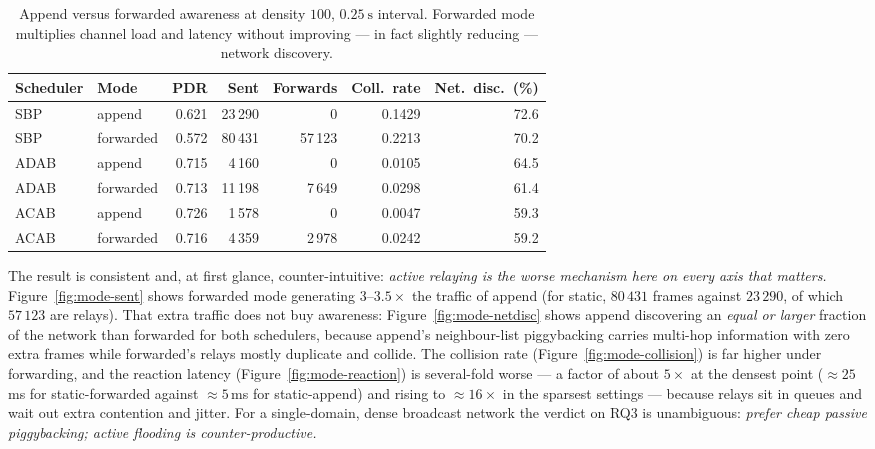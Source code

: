 \documentclass[12pt,a4paper,oneside]{report}
\begin{document}
\begin{table}[t]
\centering
\caption{Append versus forwarded awareness at density $100$,
$\SI{0.25}{\second}$ interval. Forwarded mode multiplies channel load and
latency without improving --- in fact slightly reducing --- network discovery.}
\label{tab:modes}
\begin{tabular}{llrrrrr}
\toprule
Scheduler & Mode & PDR & Sent & Forwards & Coll.\ rate & Net.\ disc.\ (\%) \\
\midrule
SBP  & append    & 0.621 & 23\,290 & 0      & 0.1429 & 72.6 \\
SBP  & forwarded & 0.572 & 80\,431 & 57\,123 & 0.2213 & 70.2 \\
ADAB & append    & 0.715 & 4\,160  & 0      & 0.0105 & 64.5 \\
ADAB & forwarded & 0.713 & 11\,198 & 7\,649  & 0.0298 & 61.4 \\
ACAB & append    & 0.726 & 1\,578  & 0      & 0.0047 & 59.3 \\
ACAB & forwarded & 0.716 & 4\,359  & 2\,978  & 0.0242 & 59.2 \\
\bottomrule
\end{tabular}
\end{table}

The result is consistent and, at first glance, counter-intuitive: \emph{active
relaying is the worse mechanism here on every axis that matters.}
Figure~\ref{fig:mode-sent} shows forwarded mode generating $3$--$3.5\times$ the
traffic of append (for static, $80\,431$ frames against $23\,290$, of which
$57\,123$ are relays). That extra traffic does not buy awareness:
Figure~\ref{fig:mode-netdisc} shows append discovering an \emph{equal or larger}
fraction of the network than forwarded for both schedulers, because append's
neighbour-list piggybacking carries multi-hop information with zero extra frames
while forwarded's relays mostly duplicate and collide. The collision rate
(Figure~\ref{fig:mode-collision}) is far higher under forwarding, and the
reaction latency (Figure~\ref{fig:mode-reaction}) is several-fold worse --- a
factor of about $5\times$ at the densest point ($\approx\!25$\,ms for
static-forwarded against $\approx\!5$\,ms for static-append) and rising to
$\approx\!16\times$ in the sparsest settings --- because relays sit in queues and
wait out extra contention and jitter. For a
single-domain, dense broadcast network the verdict on RQ3 is unambiguous:
\emph{prefer cheap passive piggybacking; active flooding is counter-productive.}
\end{document}
